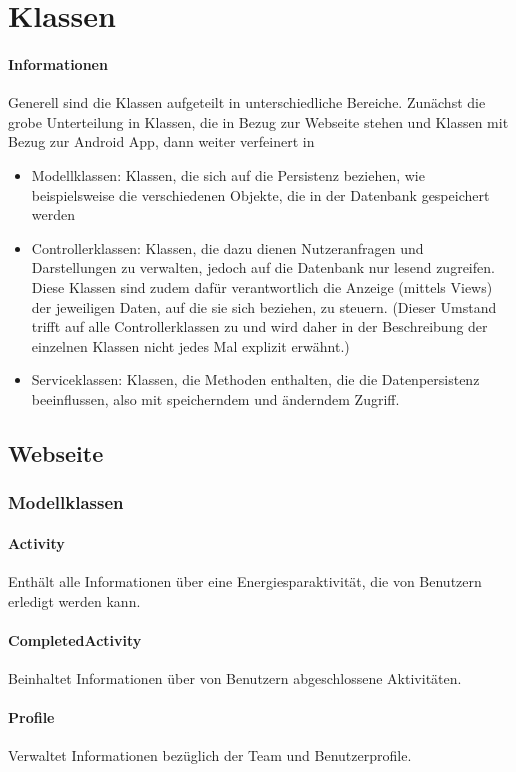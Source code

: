 \section{Klassen}
	\paragraph{Informationen}
	Generell sind die Klassen aufgeteilt in unterschiedliche Bereiche. Zun\"achst die grobe Unterteilung in Klassen, die in Bezug zur Webseite stehen und Klassen mit Bezug zur Android App, dann weiter verfeinert in
	\begin{itemize}
		\item Modellklassen: Klassen, die sich auf die Persistenz beziehen, wie beispielsweise die verschiedenen Objekte, die in der Datenbank gespeichert werden
		\item Controllerklassen: Klassen, die dazu dienen Nutzeranfragen und Darstellungen zu verwalten, jedoch auf die Datenbank nur lesend zugreifen. Diese Klassen sind zudem daf\"ur verantwortlich die Anzeige (mittels Views) der jeweiligen Daten, auf die sie sich beziehen, zu steuern. (Dieser Umstand trifft auf alle Controllerklassen zu und wird daher in der Beschreibung der einzelnen Klassen nicht jedes Mal explizit erw\"ahnt.)
		\item Serviceklassen: Klassen, die Methoden enthalten, die die Datenpersistenz beeinflussen, also mit speicherndem und \"anderndem Zugriff. 
	\end{itemize}
	
\subsection{Webseite} %

\subsubsection{Modellklassen}
	\paragraph{Activity}Enth\"alt alle Informationen \"uber eine Energiesparaktivit\"at, die von Benutzern erledigt werden kann.
	\paragraph{CompletedActivity}Beinhaltet Informationen \"uber von Benutzern abgeschlossene Aktivit\"aten.
	\paragraph{Profile}Verwaltet Informationen bez\"uglich der Team und Benutzerprofile.
